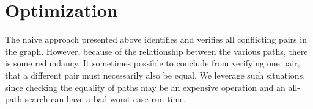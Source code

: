 \documentclass{article}
\begin{document}


\section{Optimization}

The naive approach presented above identifies and verifies all conflicting pairs in the graph. However, because of the relationship between the various paths, there is some redundancy. It sometimes possible to conclude from verifying one pair, that a different pair must necessarily also be equal. We leverage such situations, since checking the equality of paths may be an expensive operation and an all-path search can have a bad worst-case run time. 
\end{document}
